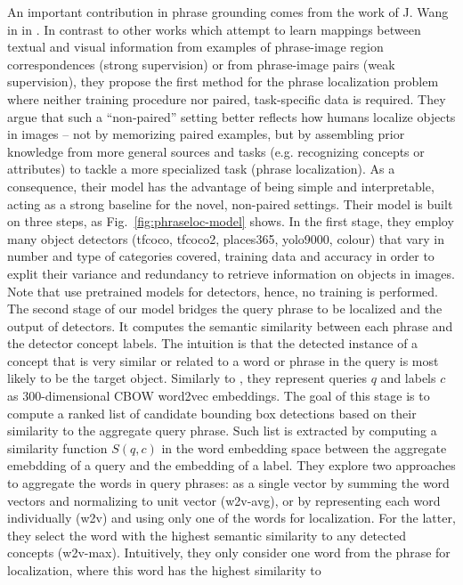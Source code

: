 An important contribution in phrase grounding comes from the work of
J. Wang in \etal{} in \cite{wang2019phrase}. In contrast to other
works which attempt to learn mappings between textual and visual
information from examples of phrase-image region correspondences
(strong supervision) or from phrase-image pairs (weak supervision),
they propose the first method for the phrase localization problem
where neither training procedure nor paired, task-specific data is
required. They argue that such a ``non-paired'' setting better
reflects how humans localize objects in images -- not by memorizing
paired examples, but by assembling prior knowledge from more general
sources and tasks (e.g. recognizing concepts or attributes) to tackle
a more specialized task (phrase localization). As a consequence, their
model has the advantage of being simple and interpretable, acting as a
strong baseline for the novel, non-paired settings. Their model is
built on three steps, as Fig.~\ref{fig:phraseloc-model} shows. In the
first stage, they employ many object detectors (tfcoco, tfcoco2,
places365, yolo9000, colour) that vary in number and type of
categories covered, training data and accuracy in order to explit
their variance and redundancy to retrieve information on objects in
images. Note that use pretrained models for detectors, hence, no
training is performed. The second stage of our model bridges the query
phrase to be localized and the output of detectors. It computes the
semantic similarity between each phrase and the detector concept
labels. The intuition is that the detected instance of a concept that
is very similar or related to a word or phrase in the query is most
likely to be the target object. Similarly to \cite{chen2018knowledge},
they represent queries $q$ and labels $c$ as $300$-dimensional CBOW
word2vec embeddings. The goal of this stage is to compute a ranked
list of candidate bounding box detections based on their similarity to
the aggregate query phrase. Such list is extracted by computing a
similarity function $S(q, c)$ in the word embedding space between the
aggregate emebdding of a query and the embedding of a label. They
explore two approaches to aggregate the words in query phrases: as a
single vector by summing the word vectors and normalizing to unit
vector (w2v-avg), or by representing each word individually (w2v) and
using only one of the words for localization. For the latter, they
select the word with the highest semantic similarity to any detected
concepts (w2v-max). Intuitively, they only consider one word from the
phrase for localization, where this word has the highest similarity to
